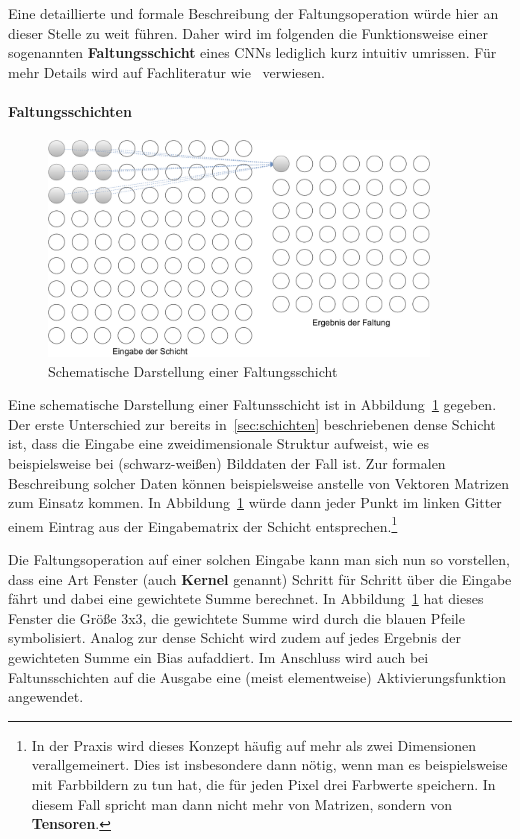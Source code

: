 Eine detaillierte und formale Beschreibung der Faltungsoperation w\"urde
hier an dieser Stelle zu weit f\"uhren. Daher wird im folgenden
die Funktionsweise einer sogenannten \textbf{Faltungsschicht} eines
CNNs lediglich kurz intuitiv umrissen. F\"ur mehr Details wird auf
Fachliteratur wie~\cite{Goodfellow-et-al-2016} verwiesen.

\paragraph{Faltungsschichten}

\begin{figure}[h]
    \centering
    \includegraphics[width=0.9\textwidth]{abbildungen/faltungsschicht}
    \caption{Schematische Darstellung einer Faltungsschicht}
    \label{fig:faltungsschicht}
\end{figure}

Eine schematische Darstellung einer Faltunsschicht ist in
Abbildung~\ref{fig:faltungsschicht} gegeben.
Der erste Unterschied zur bereits in~\ref{sec:schichten} beschriebenen
dense Schicht ist, dass die Eingabe eine zweidimensionale Struktur
aufweist, wie es beispielsweise bei (schwarz-wei{\ss}en) Bilddaten der Fall ist.
Zur formalen Beschreibung solcher Daten k\"onnen beispielsweise anstelle
von Vektoren Matrizen zum Einsatz kommen. In Abbildung~\ref{fig:faltungsschicht}
w\"urde dann jeder Punkt im linken Gitter einem Eintrag aus der Eingabematrix der
Schicht entsprechen.\footnote{In der Praxis wird dieses Konzept h\"aufig auf
    mehr als zwei Dimensionen verallgemeinert. Dies ist insbesondere
    dann n\"otig, wenn man es beispielsweise mit Farbbildern zu tun hat,
    die f\"ur jeden Pixel drei Farbwerte speichern. In diesem Fall spricht man
    dann nicht mehr von Matrizen, sondern von \textbf{Tensoren}.}

Die Faltungsoperation auf einer solchen Eingabe kann man sich nun so
vorstellen, dass eine Art Fenster (auch \textbf{Kernel} genannt)
Schritt f\"ur Schritt \"uber die Eingabe f\"ahrt und dabei eine gewichtete
Summe berechnet. In Abbildung~\ref{fig:faltungsschicht} hat dieses Fenster
die Gr\"o{\ss}e 3x3, die gewichtete Summe wird durch die blauen Pfeile
symbolisiert. Analog zur dense Schicht wird zudem auf jedes Ergebnis
der gewichteten Summe ein Bias aufaddiert. Im Anschluss wird auch bei
Faltunsschichten auf die Ausgabe eine (meist elementweise)
Aktivierungsfunktion angewendet.


